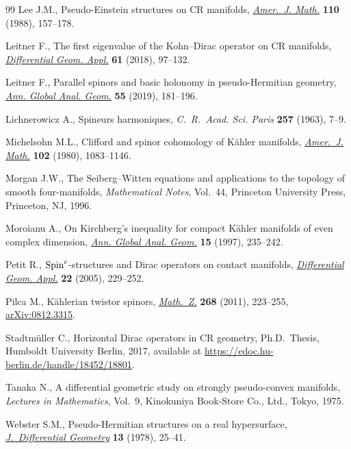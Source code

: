 \begin{thebibliography}{99}
Lee J.M., Pseudo-{E}instein structures on {CR} manifolds, \href{https://doi.org/10.2307/2374543}{\textit{Amer.~J.
 Math.}} \textbf{110} (1988), 157--178.

Leitner F., The first eigenvalue of the {K}ohn--{D}irac operator on {CR}
 manifolds, \href{https://doi.org/10.1016/j.difgeo.2018.08.004}{\textit{Differential Geom. Appl.}} \textbf{61} (2018), 97--132.

Leitner F., Parallel spinors and basic holonomy in pseudo-{H}ermitian geometry,
 \href{https://doi.org/10.1007/s10455-018-9622-4}{\textit{Ann. Global Anal. Geom.}} \textbf{55} (2019), 181--196.

Lichnerowicz A., Spineurs harmoniques, \textit{C.~R.~Acad. Sci. Paris}
 \textbf{257} (1963), 7--9.

Michelsohn M.L., Clifford and spinor cohomology of {K}\"ahler manifolds,
 \href{https://doi.org/10.2307/2374181}{\textit{Amer.~J. Math.}} \textbf{102} (1980), 1083--1146.

Morgan J.W., The {S}eiberg--{W}itten equations and applications to the topology
 of smooth four-manifolds, \textit{Mathematical Notes}, Vol.~44, Princeton
 University Press, Princeton, NJ, 1996.

Moroianu A., On {K}irchberg's inequality for compact {K}\"ahler manifolds of
 even complex dimension, \href{https://doi.org/10.1023/A:1006543304443}{\textit{Ann. Global Anal. Geom.}} \textbf{15} (1997),
 235--242.

Petit R., {${\rm Spin}^c$}-structures and {D}irac operators on contact
 manifolds, \href{https://doi.org/10.1016/j.difgeo.2005.01.003}{\textit{Differential Geom. Appl.}} \textbf{22} (2005), 229--252.

Pilca M., K\"ahlerian twistor spinors, \href{https://doi.org/10.1007/s00209-010-0668-7}{\textit{Math.~Z.}} \textbf{268} (2011),
 223--255, \href{https://arxiv.org/abs/0812.3315}{arXiv:0812.3315}.

Stadtm\"uller C., Horizontal Dirac operators in CR geometry, Ph.D.~Thesis,
 {H}umboldt University Berlin, 2017, available at
 \url{https://edoc.hu-berlin.de/handle/18452/18801}.

Tanaka N., A differential geometric study on strongly pseudo-convex manifolds,
 \textit{Lectures in Mathematics}, Vol.~9, Kinokuniya Book-Store Co., Ltd.,
 Tokyo, 1975.

Webster S.M., Pseudo-{H}ermitian structures on a real hypersurface,
 \href{https://doi.org/10.4310/jdg/1214434345}{\textit{J.~Differential Geometry}} \textbf{13} (1978), 25--41.

\end{thebibliography}
